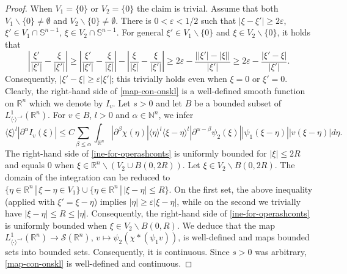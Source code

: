 \documentclass[10pt,a4paper]{amsart}
\newcommand{\NN}{\mathbb N}
\newcommand{\RR}{\mathbb R}
\newcommand{\SSS}{\mathcal S}
\begin{document}
\begin{proof}
When $V_1=\{0\}$ or $V_2=\{0\}$ the claim is trivial. Assume that both $V_1\backslash\{0\}\neq \emptyset$ and $V_2\backslash\{0\}\neq\emptyset$. There is $0<\varepsilon<1/2$ such that $|\xi-\xi'|\geq 2\varepsilon$, $\xi'\in V_1\cap\mathbb{S}^{n-1}$, $\xi\in V_2\cap\mathbb{S}^{n-1}$. For general $\xi'\in V_1\backslash\{0\}$ and $\xi\in V_2\backslash\{0\}$, it holds that
\begin{equation*}
\left|\frac{\xi'}{|\xi'|}-\frac{\xi}{|\xi'|}\right|\geq \left|\frac{\xi'}{|\xi'|}-\frac{\xi}{|\xi|}\right|-\left|\frac{\xi}{|\xi|}-\frac{\xi}{|\xi'|}\right|\geq 2\varepsilon-\frac{\left||\xi'|-|\xi|\right|}{|\xi'|}\geq 2\varepsilon-\frac{|\xi'-\xi|}{|\xi'|}.
\end{equation*}
Consequently, $|\xi'-\xi|\geq \varepsilon|\xi'|$; this trivially holds even when $\xi=0$ or $\xi'=0$.\\
\indent Clearly, the right-hand side of \eqref{map-con-onskl} is a well-defined smooth function on $\RR^n$ which we denote by $I_v$. Let $s>0$ and let $B$ be a bounded subset of $L^1_{\langle\cdot\rangle^{-s}}(\RR^n)$. For $v\in B$, $l>0$ and $\alpha\in\NN^n$, we infer
\begin{equation}\label{ine-for-operashconts}
\langle\xi\rangle^l|\partial^{\alpha}I_v(\xi)|\leq C\sum_{\beta\leq \alpha} \int_{\RR^n}|\partial^{\beta}\chi(\eta)|\langle\eta\rangle^l\langle\xi-\eta\rangle^l|\partial^{\alpha-\beta}\psi_2(\xi)| |\psi_1(\xi-\eta)||v(\xi-\eta)|d\eta.
\end{equation}
The right-hand side of \eqref{ine-for-operashconts} is uniformly bounded for $|\xi|\leq 2R$ and equals $0$ when $\xi\in \RR^n\backslash (V_2\cup B(0,2R))$. Let $\xi\in V_2\backslash B(0,2R)$. The domain of the integration can be reduced to $\{\eta\in\RR^n\,|\,\xi-\eta\in V_1\}\cup\{\eta\in\RR^n\,|\, |\xi-\eta|\leq R\}$. On the first set, the above inequality (applied with $\xi'=\xi-\eta$) implies $|\eta|\geq \varepsilon|\xi-\eta|$, while on the second we trivially have $|\xi-\eta|\leq R\leq |\eta|$. Consequently, the right-hand side of \eqref{ine-for-operashconts} is uniformly bounded when $\xi\in V_2\backslash B(0,R)$. We deduce that the map $L^1_{\langle \cdot\rangle^{-s}}(\RR^n)\rightarrow \SSS(\RR^n)$, $v\mapsto \psi_2(\chi*(\psi_1v))$, is well-defined and maps bounded sets into bounded sets. Consequently, it is continuous. Since $s>0$ was arbitrary, \eqref{map-con-onskl} is well-defined and continuous.
\end{proof}
\end{document}
